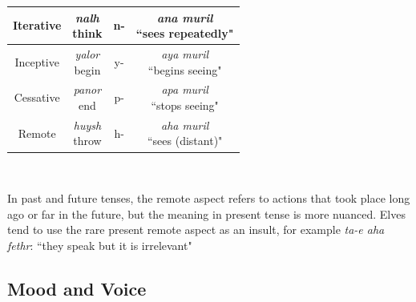 \begin{table}[h!]
\begin{tabular}{c|c|c|c}
         Iterative&\makecell{\textit{nalh} \\ think}& n- & \makecell{\textit{ana muril} \\ ``sees repeatedly" }\\ \hline
         Inceptive&\makecell{\textit{yalor} \\ begin}& y- & \makecell{\textit{aya muril} \\ ``begins  seeing" }\\ \hline
         Cessative&\makecell{\textit{panor} \\ end}& p- & \makecell{\textit{apa muril} \\ ``stops seeing" }\\ \hline
         Remote&\makecell{\textit{huysh} \\ throw}  & h- & \makecell{\textit{aha muril} \\``sees (distant)" \footnotemark[1]} \\
     \end{tabular}
     \\
     \medskip
     \raggedright
     {\footnotesize \footnotemark[1] \raggedleft In past and future tenses, the remote aspect refers to actions that took place long ago or far in the future, but the meaning in present tense is more nuanced. Elves tend to use the rare present remote aspect as an insult, for example \textit{ta-e aha fethr}: ``they speak but it is irrelevant"}
    \label{tab:aspects}
\end{table}

\medskip


\subsection*{Mood and Voice}

